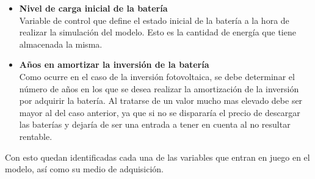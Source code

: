 \begin{itemize}
	\item \textbf{Nivel de carga inicial de la batería}\\ Variable de control que define el estado inicial de la batería a la hora de realizar la simulación del modelo. Esto es la cantidad de energía que tiene almacenada la misma.
	\item \textbf{Años en amortizar la inversión de la batería}\\ Como ocurre en el caso de la inversión fotovoltaica, se debe determinar el número de años en los que se desea realizar la amortización de la inversión por adquirir la batería. Al tratarse de un valor mucho mas elevado debe ser mayor al del caso anterior, ya que si no se dispararía el precio de descargar las baterías y dejaría de ser una entrada a tener en cuenta al no resultar rentable.
\end{itemize}
Con esto quedan identificadas cada una de las variables que entran en juego en el modelo, así como su medio de adquisición.
